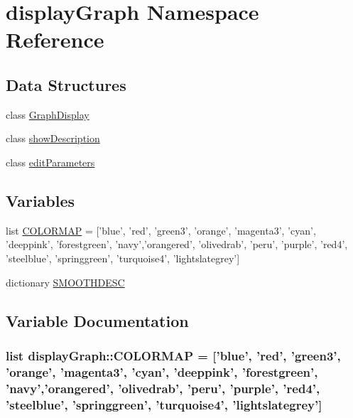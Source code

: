 \hypertarget{namespacedisplayGraph}{
\section{displayGraph Namespace Reference}
\label{namespacedisplayGraph}
}


\subsection*{Data Structures}
\begin{CompactItemize}
\item 
class \hyperlink{classdisplayGraph_1_1GraphDisplay}{GraphDisplay}
\item 
class \hyperlink{classdisplayGraph_1_1showDescription}{showDescription}
\item 
class \hyperlink{classdisplayGraph_1_1editParameters}{editParameters}
\end{CompactItemize}
\subsection*{Variables}
\begin{CompactItemize}
\item 
list \hyperlink{namespacedisplayGraph_1bb3edce833fcde0acec743a2ab29d7b}{COLORMAP} = \mbox{[}'blue', 'red', 'green3', 'orange', 'magenta3', 'cyan', 'deeppink', 'forestgreen', 'navy','orangered', 'olivedrab', 'peru', 'purple', 'red4', 'steelblue', 'springgreen', 'turquoise4', 'lightslategrey'\mbox{]}
\item 
dictionary \hyperlink{namespacedisplayGraph_677eaaea795085997b6f4651dff9c20c}{SMOOTHDESC}
\end{CompactItemize}


\subsection{Variable Documentation}
\hypertarget{namespacedisplayGraph_1bb3edce833fcde0acec743a2ab29d7b}{
\subsubsection{\setlength{\rightskip}{0pt plus 5cm}list {\bf displayGraph::COLORMAP} = \mbox{[}'blue', 'red', 'green3', 'orange', 'magenta3', 'cyan', 'deeppink', 'forestgreen', 'navy','orangered', 'olivedrab', 'peru', 'purple', 'red4', 'steelblue', 'springgreen', 'turquoise4', 'lightslategrey'\mbox{]}}}
\label{namespacedisplayGraph_1bb3edce833fcde0acec743a2ab29d7b}


